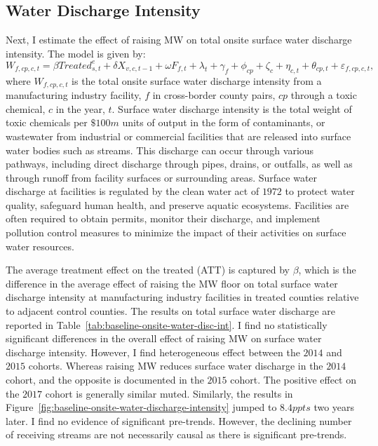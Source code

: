 \documentclass[12pt, english]{article}
\begin{document}
    \subsection{Water Discharge Intensity}\label{subsec:water-discharge-intensity}
    Next, I estimate the effect of raising MW on total onsite surface water discharge intensity. The model is given by:
    \begin{equation}
        W_{f,cp,c,t} = \beta Treated_{s,t}^e + \delta X_{v,c,t-1} + \omega F_{f,t} + \lambda_{t} + \gamma_{f} + \phi_{cp} + \zeta_{c} + \eta_{c,t} + \theta_{cp,t} + \varepsilon_{f,cp,c,t},\label{eq:baseline-onsite-water-discharge-intensity}
    \end{equation}
    where $W_{f,cp,c,t}$ is the total onsite surface water discharge intensity from a manufacturing industry facility, $f$ in cross-border county pairs, $cp$ through a toxic chemical, $c$ in the year, $t$. Surface water discharge intensity is the total weight of toxic chemicals per $\$100m$ units of output in the form of contaminants, or wastewater from industrial or commercial facilities that are released into surface water bodies such as streams. This discharge can occur through various pathways, including direct discharge through pipes, drains, or outfalls, as well as through runoff from facility surfaces or surrounding areas. Surface water discharge at facilities is regulated by the clean water act of $1972$ to protect water quality, safeguard human health, and preserve aquatic ecosystems. Facilities are often required to obtain permits, monitor their discharge, and implement pollution control measures to minimize the impact of their activities on surface water resources.
    

    The average treatment effect on the treated (ATT) is captured by $\beta$, which is the difference in the average effect of raising the MW floor on total surface water discharge intensity at manufacturing industry facilities in treated counties relative to adjacent control counties. The results on total surface water discharge are reported in Table~\ref{tab:baseline-onsite-water-disc-int}. I find no statistically significant differences in the overall effect of raising MW on surface water discharge intensity. However, I find heterogeneous effect between the $2014$ and $2015$ cohorts. Whereas raising MW reduces surface water discharge in the $2014$ cohort, and the opposite is documented in the $2015$ cohort. The positive effect on the $2017$ cohort is generally similar muted. Similarly, the results in Figure~\ref{fig:baseline-onsite-water-discharge-intensity} jumped to $8.4ppts$ two years later. I find no evidence of significant pre-trends. However, the declining number of receiving streams are not necessarily causal as there is significant pre-trends.
    
\end{document}
